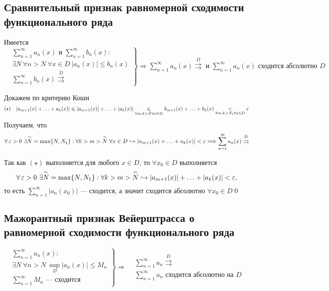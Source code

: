 \documentclass[a4paper]{article}
\begin{document}
\subsection{Сравнительный признак равномерной сходимости функционального ряда}
\theorem Имеется $\left.\begin{aligned}
    &\sum_{n=1}^{\infty}a_n(x)\text{ и }\sum_{n=1}^{\infty}b_n(x):\\
    &\exists N\ \forall n>N\ \forall x\in D\ |a_n(x)|\leqslant b_n(x)\\
    &\sum_{n=1}^{\infty}b_n(x)\overset{D}{\rightrightarrows}
\end{aligned}\right\}\Longrightarrow \sum_{n=1}^{\infty}a_n(x)\overset{D}{\rightrightarrows}\text{ и }\sum_{n=1}^{\infty}a_n(x)\text{ сходится абсолютно }D$

\proof Докажем по критерию Коши
\begin{equation*}
    (\star)\quad |a_{m+1}(x)+\ldots+a_k(x)|\leqslant |a_{m+1}(x)|+\ldots+|a_k(x)|\underset{\forall m,k>N\forall x\in D}{\leqslant}b_{m+1}(x)+\ldots+b_{k}(x)\underset{\forall m, k>N_1 \forall x\in D}{<}\operatorname{\varepsilon} 
\end{equation*}
Получаем, что 
\begin{equation*}
    \forall\ve>0\ \exists \overset{\sim}{N}=\max\{N,N_1\}: \forall k>m>\overset{\sim}{N}\ \forall x\in D\hookrightarrow|a_{m+1}(x)+\ldots+a_k(x)|<\ve\Longrightarrow\sum_{n=1}^{\infty}a_n(x)\overset{D}{\rightrightarrows}
\end{equation*}

Так как $(\star)$ выполняется для любого $x\in D$, то $\forall x_0\in D$ выполняется 
\begin{equation*}
    \forall\operatorname{\varepsilon}>0\ \exists \overset{\sim}{N}=\max\{N,N_1\}: \forall k>m>\overset{\sim}{N}\hookrightarrow |a_{m+1}(x)|+\ldots+|a_k(x)|<\operatorname{\varepsilon},
\end{equation*}
то есть $\sum_{n=1}^{\infty}|a_n(x_0)|$ — сходится, а значит сходится абсолютно $\forall x_0\in D$\qed

\subsection{Мажорантный признак Вейерштрасса о равномерной сходимости функционального ряда}
\corollary $\left.\begin{aligned}
    &\sum_{n=1}^{\infty}a_n(x):\\
    &\exists N\ \forall n>N\ \sup\limits_{D}|a_n(x)|\leqslant M_n\\
    &\sum_{n=1}^{\infty} M_n\text{ — сходится}
\end{aligned}\right\}\Longrightarrow \begin{aligned}
    &\sum_{n=1}^{\infty}a_n\overset{D}{\rightrightarrows}\\
    &\sum_{n=1}^{\infty}a_n\text{ сходится абсолютно на }D
\end{aligned}$
\end{document}

